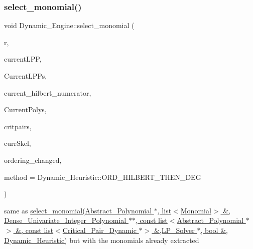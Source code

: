 \subsubsection{\texorpdfstring{select\+\_\+monomial()}{select\_monomial()}\hspace{0.1cm}{\footnotesize\ttfamily [2/2]}}
{\footnotesize\ttfamily void Dynamic\+\_\+\+Engine\+::select\+\_\+monomial (\begin{DoxyParamCaption}\item[{const set$<$ \hyperlink{group__polygroup_class_monomial}{Monomial} $>$}]{r,  }\item[{const \hyperlink{group__polygroup_class_monomial}{Monomial} \&}]{current\+L\+PP,  }\item[{list$<$ \hyperlink{group__polygroup_class_monomial}{Monomial} $>$ \&}]{Current\+L\+P\+Ps,  }\item[{\hyperlink{group__polygroup_class_dense___univariate___integer___polynomial}{Dense\+\_\+\+Univariate\+\_\+\+Integer\+\_\+\+Polynomial} $\ast$$\ast$}]{current\+\_\+hilbert\+\_\+numerator,  }\item[{const list$<$ \hyperlink{group__polygroup_class_abstract___polynomial}{Abstract\+\_\+\+Polynomial} $\ast$ $>$ \&}]{Current\+Polys,  }\item[{const list$<$ \hyperlink{group___g_b_computation_class_critical___pair___dynamic}{Critical\+\_\+\+Pair\+\_\+\+Dynamic} $\ast$ $>$ \&}]{critpairs,  }\item[{\hyperlink{group___c_l_s_solvers_class_l_p___solvers_1_1_l_p___solver}{L\+P\+\_\+\+Solver} $\ast$}]{curr\+Skel,  }\item[{bool \&}]{ordering\+\_\+changed,  }\item[{\hyperlink{group___g_b_computation_ga819b1fd40d9a40ff303df3b90647ecb0}{Dynamic\+\_\+\+Heuristic}}]{method = {\ttfamily Dynamic\+\_\+Heuristic\+:\+:ORD\+\_\+HILBERT\+\_\+THEN\+\_\+DEG} }\end{DoxyParamCaption})}



same as {\ttfamily \hyperlink{group___g_b_computation_gaa01d88c431b84deabf51ee116d7d2a0e}{select\+\_\+monomial(\+Abstract\+\_\+\+Polynomial $\ast$, list$<$\+Monomial$>$ \&, Dense\+\_\+\+Univariate\+\_\+\+Integer\+\_\+\+Polynomial $\ast$$\ast$, const list$<$\+Abstract\+\_\+\+Polynomial $\ast$$>$ \&, const list$<$\+Critical\+\_\+\+Pair\+\_\+\+Dynamic $\ast$$>$ \&,\+L\+P\+\_\+\+Solver $\ast$, bool \&, Dynamic\+\_\+\+Heuristic)}} but with the monomials already extracted 



